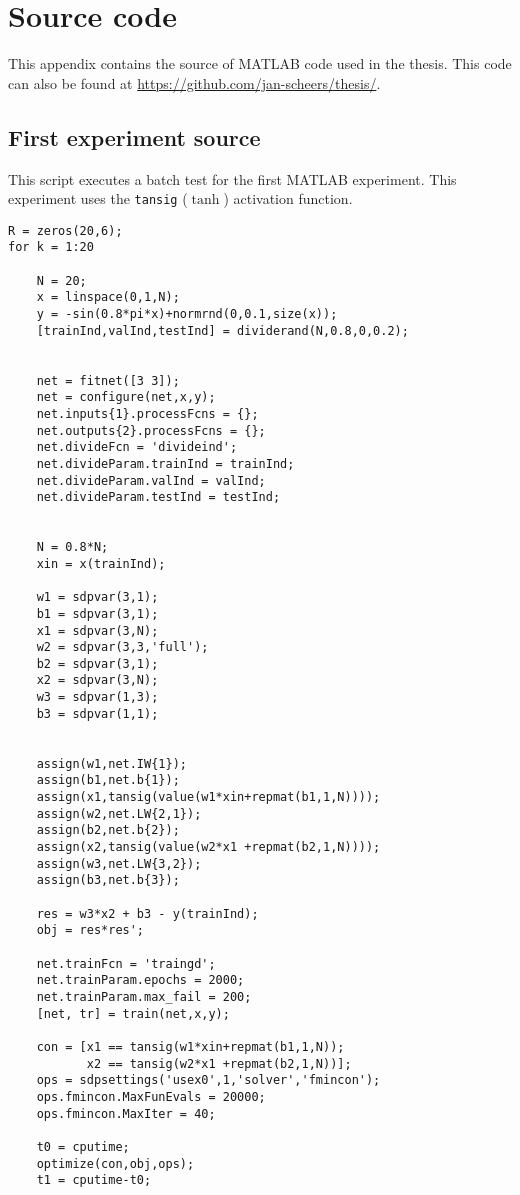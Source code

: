\chapter{Source code}
\label{app:A}
This appendix contains the source of MATLAB code used in the thesis.  This code can also be found at \url{https://github.com/jan-scheers/thesis/}.

\section{First experiment source}
This script executes a batch test for the first MATLAB experiment. This experiment uses the \texttt{tansig} ($\tanh$) activation function.
\begin{verbatim}
R = zeros(20,6);
for k = 1:20
    
    N = 20;
    x = linspace(0,1,N);
    y = -sin(0.8*pi*x)+normrnd(0,0.1,size(x));
    [trainInd,valInd,testInd] = dividerand(N,0.8,0,0.2);

    
    net = fitnet([3 3]);
    net = configure(net,x,y);
    net.inputs{1}.processFcns = {};
    net.outputs{2}.processFcns = {};
    net.divideFcn = 'divideind';
    net.divideParam.trainInd = trainInd;
    net.divideParam.valInd = valInd;
    net.divideParam.testInd = testInd;
    
    
    N = 0.8*N;
    xin = x(trainInd);

    w1 = sdpvar(3,1);
    b1 = sdpvar(3,1);
    x1 = sdpvar(3,N);
    w2 = sdpvar(3,3,'full');
    b2 = sdpvar(3,1);
    x2 = sdpvar(3,N);
    w3 = sdpvar(1,3);
    b3 = sdpvar(1,1);


    assign(w1,net.IW{1});
    assign(b1,net.b{1});
    assign(x1,tansig(value(w1*xin+repmat(b1,1,N))));
    assign(w2,net.LW{2,1});
    assign(b2,net.b{2});
    assign(x2,tansig(value(w2*x1 +repmat(b2,1,N))));
    assign(w3,net.LW{3,2});
    assign(b3,net.b{3});

    res = w3*x2 + b3 - y(trainInd);
    obj = res*res';
    
    net.trainFcn = 'traingd';
    net.trainParam.epochs = 2000;
    net.trainParam.max_fail = 200;
    [net, tr] = train(net,x,y);

    con = [x1 == tansig(w1*xin+repmat(b1,1,N));
           x2 == tansig(w2*x1 +repmat(b2,1,N))];
    ops = sdpsettings('usex0',1,'solver','fmincon');
    ops.fmincon.MaxFunEvals = 20000;
    ops.fmincon.MaxIter = 40;

    t0 = cputime;
    optimize(con,obj,ops);
    t1 = cputime-t0;
    

\end{verbatim}
